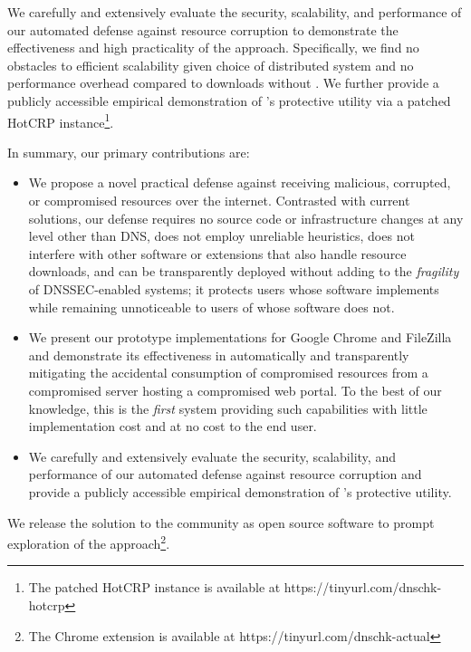 We carefully and extensively evaluate the security, scalability, and performance
of our automated defense against resource corruption to demonstrate the
effectiveness and high practicality of the \SYSTEM{} approach. Specifically, we
find no obstacles to efficient scalability given choice of distributed system
and no performance overhead compared to downloads without \SYSTEM{}. We further
provide a publicly accessible empirical demonstration of \SYSTEM{}'s protective
utility via a patched HotCRP instance\footnote{The patched HotCRP instance is
available at https://tinyurl.com/dnschk-hotcrp}.

In summary, our primary contributions are:

\begin{itemize}

  \item We propose a novel practical defense against receiving malicious,
  corrupted, or compromised resources over the internet. Contrasted with current
  solutions, our defense requires no source code or infrastructure changes at
  any level other than DNS, does not employ unreliable heuristics, does not
  interfere with other software or extensions that also handle resource
  downloads, and can be transparently deployed without adding to the
  \textit{fragility} of DNSSEC-enabled systems; it protects users whose software
  implements \SYSTEM{} while remaining unnoticeable to users of whose software
  does not.

  \item We present our prototype \SYSTEM{} implementations for Google Chrome and
  FileZilla and demonstrate its effectiveness in automatically and transparently
  mitigating the accidental consumption of compromised resources from a
  compromised server hosting a compromised web portal. To the best of our
  knowledge, this is the \emph{first} system providing such capabilities with
  little implementation cost and at no cost to the end user.

  \item We carefully and extensively evaluate the security, scalability, and
  performance of our automated defense against resource corruption and provide a
  publicly accessible empirical demonstration of \SYSTEM{}'s protective utility.

\end{itemize}

We release the \SYSTEM{} solution to the community as open source software to
prompt exploration of the \SYSTEM{} approach\footnote{The \SYSTEM{} Chrome
extension is available at https://tinyurl.com/dnschk-actual}.
